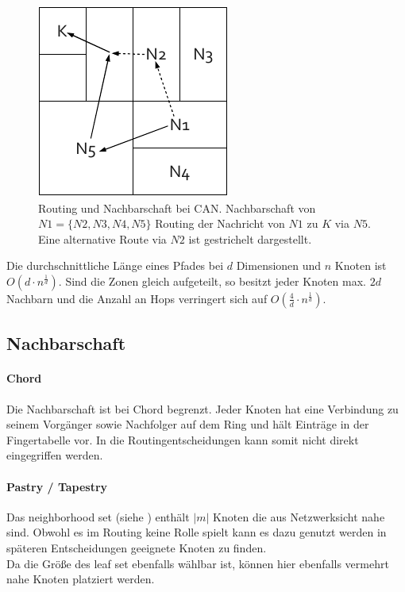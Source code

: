 \begin{figure}[htbp]
\centering
\includegraphics{grafics/can_routing.pdf}
\caption{Routing und Nachbarschaft bei CAN. Nachbarschaft von $N1 = \{N2, N3, N4, N5\}$ Routing der Nachricht von $N1$ zu $K$ via $N5$. Eine alternative Route via $N2$ ist gestrichelt dargestellt.}
\label{fig:can_routing}
\end{figure}

Die durchschnittliche Länge eines Pfades bei $d$ Dimensionen und $n$ Knoten ist $O(d\cdot n^\frac{1}{d})$. Sind die Zonen gleich aufgeteilt, so besitzt jeder Knoten max. $2d$ Nachbarn und die Anzahl an Hops verringert sich auf $O(\frac{4}{d}\cdot n^\frac{1}{d})$.


\subsection*{Nachbarschaft}
\paragraph{Chord}
Die Nachbarschaft ist bei Chord begrenzt. Jeder Knoten hat eine Verbindung zu seinem Vorgänger sowie Nachfolger auf dem Ring und hält Einträge in der Fingertabelle vor. In die Routingentscheidungen kann somit nicht direkt eingegriffen werden.

\paragraph{Pastry / Tapestry}
Das neighborhood set (siehe ) enthält $|m|$ Knoten die aus Netzwerksicht nahe sind. Obwohl es im Routing keine Rolle spielt kann es dazu genutzt werden in späteren Entscheidungen geeignete Knoten zu finden.\\
Da die Größe des leaf set ebenfalls wählbar ist, können hier ebenfalls vermehrt nahe Knoten platziert werden.


